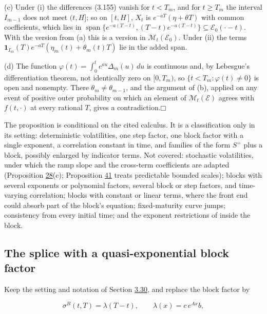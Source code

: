 \documentclass[11pt]{article}
\providecommand{\square}{\mdlgwhtsquare}
\begin{document}
(c) Under (i) the differences (3.155) vanish for \(t<T_m\), and for \(t\ge T_m\) the interval \(I_{m-1}\) does not meet \((t,H]\); so on \([t,H]\), \(X_t\) is \(e^{-aT}(\eta+\theta T)\) with common coefficients, which lies in \(\operatorname{span}\{e^{-a(T-t)},(T-t)e^{-a(T-t)}\}\subseteq\mathcal E_0(\cdot-t)\). With the version from (a) this is a version in \(\mathcal M_t(\mathcal E_0)\). Under (ii) the terms \(\mathbf 1_{I_m}(T)e^{-aT}(\eta_m(t)+\theta_m(t)T)\) lie in the added span.

(d) The function \(\varphi(t)=\int_0^te^{au}\Delta_m(u)\,du\) is continuous and, by Lebesgue's differentiation theorem, not identically zero on \([0,T_m)\), so \(\{t<T_m:\varphi(t)\neq0\}\) is open and nonempty. There \(\theta_m\neq\theta_{m-1}\), and the argument of (b), applied on any event of positive outer probability on which an element of \(\mathcal M_t(\mathcal E)\) agrees with \(f(t,\cdot)\) at every rational \(T\), gives a contradiction.\hfill$\square$

The proposition is conditional on the cited calculus. It is a classification only in its setting: deterministic volatilities, one step factor, one block factor with a single exponent, a correlation constant in time, and families of the form \(S^+\) plus a block, possibly enlarged by indicator terms. Not covered: stochastic volatilities, under which the ramp slope and the cross-term coefficients are adapted (Proposition \hyperref[res:Proposition-28]{28}(c); Proposition \hyperref[res:Proposition-41]{41} treats predictable bounded scales); blocks with several exponents or polynomial factors, several block or step factors, and time-varying correlation; blocks with constant or linear terms, where the front end could absorb part of the block's equation; fixed-maturity curve jumps; consistency from every initial time; and the exponent restrictions of \cite{sharef2004conditions} inside the block.

\subsection{The splice with a quasi-exponential block factor}\label{sec:3.31}

Keep the setting and notation of Section \hyperref[sec:3.30]{3.30}, and replace the block factor by

\begin{equation*}
\sigma^B(t,T)=\lambda(T-t),\qquad \lambda(x)=c\,e^{Ax}b, \tag{3.156}\label{eq:3.156}
\end{equation*}
\end{document}

